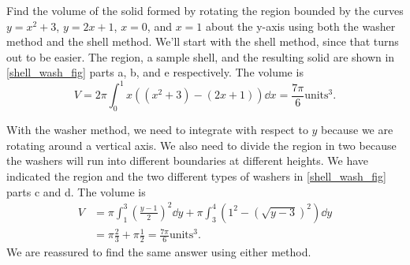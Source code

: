 \begin{example}\label{ex_shell_wash}
Find the volume of the solid formed by rotating the region bounded by the curves $y=x^2+3$, $y=2x+1$, $x=0$, and $x=1$ about the y-axis using both the washer method and the shell method.
\solution
We'll start with the shell method, since that turns out to be easier.  The region, a sample shell, and the resulting solid are shown in \autoref{shell_wash_fig} parts a, b, and e respectively.  The volume is
\[
V=2\pi\int_0^1 x((x^2+3)-(2x+1))\dd x
=\frac{7\pi}6\text{units}^3.
\]

With the washer method, we need to integrate with respect to $y$ because we are rotating around a vertical axis.  We also need to divide the region in two because the washers will run into different boundaries at different heights.  We have indicated the region and the two different types of washers in \autoref{shell_wash_fig} parts c and d.  The volume is
\begin{align*}
V&=\pi\int_1^3\left(\frac{y-1}2\right)^2\dd y
+\pi\int_3^4\left(1^2-\left(\sqrt{y-3}\right)^2\right)\dd y\\
&=\pi\frac23+\pi\frac12
=\frac{7\pi}6\text{units}^3.
\end{align*}
We are reassured to find the same answer using either method.
\end{example}

